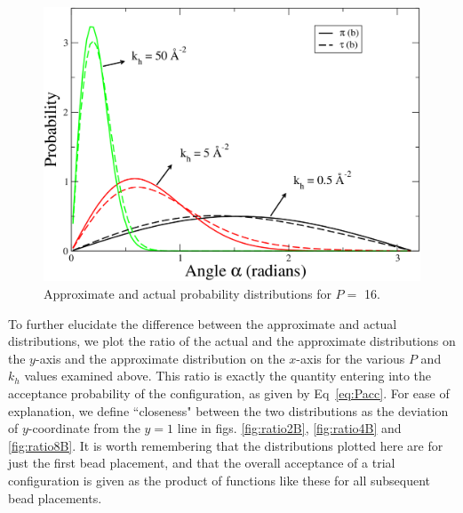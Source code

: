                 \begin{figure}[!htbp]
                    \centering
                    \includegraphics[scale=0.20,keepaspectratio]{Chapter-4/Figures/phi8B.png}
                    \caption{Approximate and actual probability distributions for $P =$ 16.}
                    \label{fig:phi8B}
                \end{figure}

                To further elucidate the difference between the approximate and actual distributions, we plot the ratio of the actual and the approximate distributions on the $y$-axis and the approximate distribution on the $x$-axis for the various $P$ and $k_h$ values examined above. This ratio is exactly the quantity entering into the acceptance probability of the configuration, as given by Eq~\eqref{eq:Pacc}. For ease of explanation, we define ``closeness" between the two distributions as the deviation of $y$-coordinate from the $y = 1$ line in figs. \ref{fig:ratio2B}, \ref{fig:ratio4B} and \ref{fig:ratio8B}. It is worth remembering that the distributions plotted here are for just the first bead placement, and that the overall acceptance of a trial configuration is given as the product of functions like these for all subsequent bead placements.

